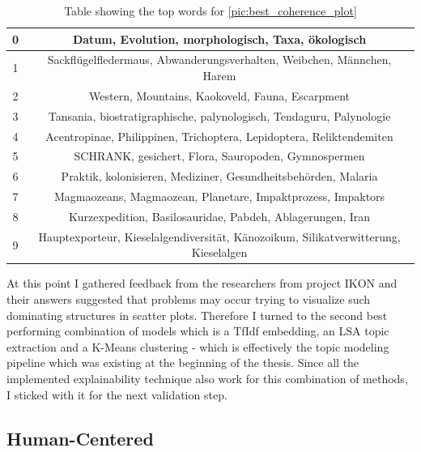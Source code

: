 \begin{table}
	\centering
	\begin{tabular}{c | c}
		0 & Datum, Evolution, morphologisch, Taxa, ökologisch \\ \hline
		1 & Sackflügelfledermaus, Abwanderungsverhalten, Weibchen, Männchen, Harem \\ \hline
		2 & Western, Mountains, Kaokoveld, Fauna, Escarpment \\ \hline
		3 & Tansania, biostratigraphische, palynologisch, Tendaguru, Palynologie \\ \hline
		4 & Acentropinae, Philippinen, Trichoptera, Lepidoptera, Reliktendemiten \\ \hline
		5 & SCHRANK, gesichert, Flora, Sauropoden, Gymnospermen \\ \hline
		6 & Praktik, kolonisieren, Mediziner, Gesundheitsbehörden, Malaria \\ \hline
		7 & Magmaozeans, Magmaozean, Planetare, Impaktprozess, Impaktors \\ \hline
		8 & Kurzexpedition, Basilosauridae, Pabdeh, Ablagerungen, Iran \\ \hline
		9 & Hauptexporteur, Kieselalgendiversität, Känozoikum, Silikatverwitterung, Kieselalgen \\ \hline
	\end{tabular}
	\caption{\label{tab:best_coherence_table} Table showing the top words for {\autoref{pic:best_coherence_plot}}}
\end{table}

At this point I gathered feedback from the researchers from project IKON and their answers suggested that problems may occur trying to visualize such dominating structures in scatter plots.
Therefore I turned to the second best performing combination of models which is a TfIdf embedding, an LSA topic extraction and a K-Means clustering - which is effectively the topic modeling pipeline which was existing at the beginning of the thesis. Since all the implemented explainability technique also work for this combination of methods, I sticked with it for the next validation step. 

\subsection{Human-Centered}


